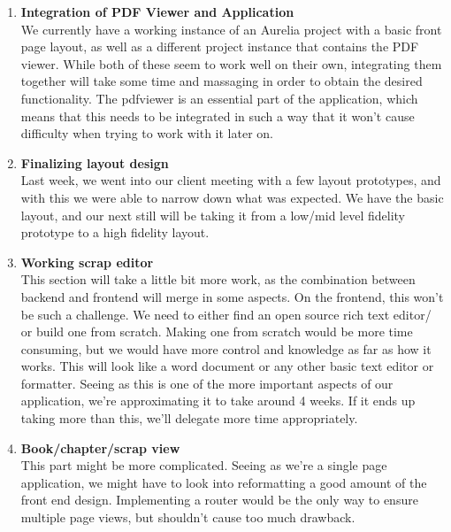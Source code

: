 \documentclass[onecolumn, draftclsnofoot,10pt, compsoc]{IEEEtran}
\begin{document}
\begin{enumerate}
    \item
    \textbf{Integration of PDF Viewer and Application} \\
	We currently have a working instance of an Aurelia project with a basic front page layout,
	as well as a different project instance that contains the PDF viewer. While both of these
	seem to work well on their own, integrating them together will take some time and massaging
	in order to obtain the desired functionality. The pdfviewer is an essential part of the
	application, which means that this needs to be integrated in such a way that it won't cause
	difficulty when trying to work with it later on. \\

    \item
    \textbf{Finalizing layout design} \\
	Last week, we went into our client meeting with a few layout prototypes, and with this we
	were able to narrow down what was expected. We have the basic layout, and our next still
	will be taking it from a low/mid level fidelity prototype to a high fidelity layout. \\

	\item
	\textbf{Working scrap editor} \\
	This section will take a little bit more work, as the combination between backend and
	frontend will merge in some aspects. On the frontend, this won't be such a challenge.
	We need to either find an open source rich text editor/ or build one from scratch.
	Making one from scratch would be more time consuming, but we would have more control
	and knowledge as far as how it works. This will look like a word document or any other
	basic text editor or formatter. Seeing as this is one of the more important aspects of
	our application, we're approximating it to take around 4 weeks. If it ends up taking more
	than this, we'll delegate more time appropriately. \\

	\item
	\textbf{Book/chapter/scrap view} \\
	This part might be more complicated. Seeing as we're a single page application, we might
	have to look into reformatting a good amount of the front end design. Implementing a router
	would be the only way to ensure multiple page views, but shouldn't cause too much drawback. \\


\end{enumerate}
\end{document}
